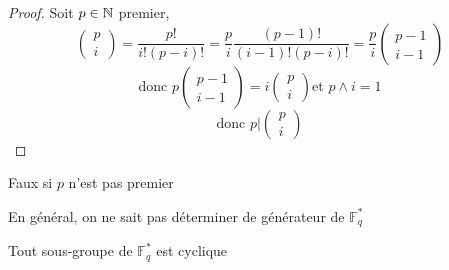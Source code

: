 \documentclass[]{report}
\begin{document}
    \begin{proof}
        Soit $p\in\mathbb{N}$ premier,
        \[\begin{pmatrix}
            p\\
            i
        \end{pmatrix}=\frac{p!}{i!(p-i)!}=\frac{p}{i}\frac{(p-1)!}{(i-1)!(p-i)!}=\frac{p}{i}\begin{pmatrix}
            p-1\\
            i-1
        \end{pmatrix}\]
        \[\text{donc }p\begin{pmatrix}
            p-1\\
            i-1
        \end{pmatrix}=i\begin{pmatrix}
        p\\
        i
        \end{pmatrix}\text{et }p\wedge i=1\]
        \[\text{donc }p|\begin{pmatrix}
            p\\
            i
        \end{pmatrix}\]
    \end{proof}

    \begin{re}{}{}
        Faux si $p$ n'est pas premier
    \end{re}

    \begin{re}{}{}
        En général, on ne sait pas déterminer de générateur de $\mathbb{F}_q^*$
    \end{re}

    \begin{re}{}{}
        Tout sous-groupe de $\mathbb{F}_q^*$ est cyclique
    \end{re}
\end{document}
